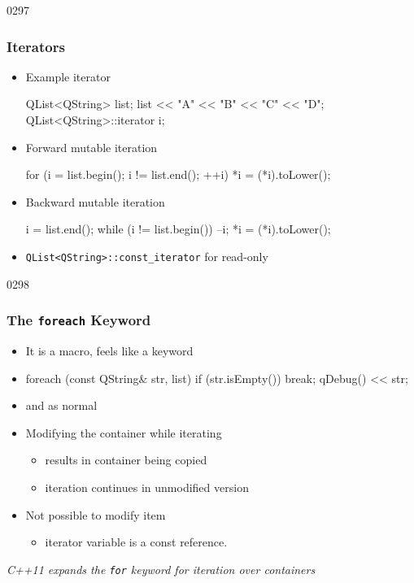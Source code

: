 \begin{slide}[fragile]{0297}\frametitle{ Iterators}
\vspace*{-4mm}
\begin{itemize}
  \item Example  iterator
\begin{cpp}
QList<QString> list;
list << "A" << "B" << "C" << "D";
QList<QString>::iterator i;
\end{cpp}
\item Forward mutable iteration
\begin{cpp}
for (i = list.begin(); i != list.end(); ++i) {
    *i = (*i).toLower();
}
\end{cpp}
\item Backward mutable iteration
\begin{cpp}
i = list.end();
while (i != list.begin()) {
    --i;
    *i = (*i).toLower();
}
\end{cpp}  
\item \lstinline{QList<QString>::const_iterator} for read-only
\end{itemize}
\end{slide}


\begin{slide}[fragile]{0298}\frametitle{The \texttt{foreach} Keyword}
 \begin{itemize}
  \item It is a macro, feels like a keyword
  \item[] \begin{cpp}
foreach (const QString& str, list) {
  if (str.isEmpty())
    break;
  qDebug() << str;
}    
  \end{cpp}
  \item {} and  as normal
  \item Modifying the container while iterating
  \begin{itemize}
  	\item results in container being copied
  	\item iteration continues in unmodified version
  \end{itemize}
  \item Not possible to modify item
  \begin{itemize}
  	\item iterator variable is a const reference.
  \end{itemize}
\end{itemize}
\vspace{1em}
\footnotesize\textit{C++11 expands the \texttt{for} keyword for iteration over containers}
\end{slide}

